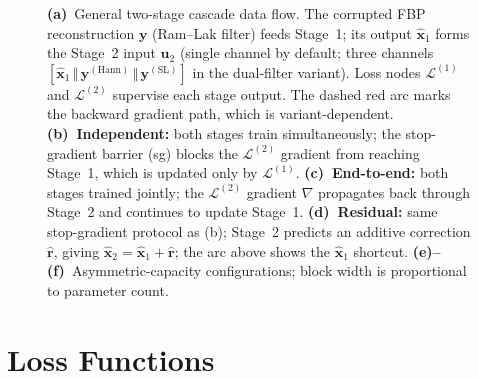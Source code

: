 \begin{figure}[!htb]
\caption[Cascade architecture variants.]{%
    \textbf{(a)}~General two-stage cascade data flow. The corrupted FBP
    reconstruction $\mathbf{y}$ (Ram--Lak filter) feeds Stage~1; its output
    $\hat{\mathbf{x}}_1$ forms the Stage~2 input $\mathbf{u}_2$ (single channel by default;
    three channels $[\hat{\mathbf{x}}_1\,\Vert\,\mathbf{y}^{(\mathrm{Hann})}\,\Vert\,\mathbf{y}^{(\mathrm{SL})}]$
    in the dual-filter variant).
    Loss nodes $\mathcal{L}^{(1)}$ and $\mathcal{L}^{(2)}$ supervise
    each stage output. The dashed red arc marks the backward gradient path,
    which is variant-dependent.
    \textbf{(b)~Independent:} both stages train simultaneously; the
    stop-gradient barrier (sg) blocks the $\mathcal{L}^{(2)}$ gradient from
    reaching Stage~1, which is updated only by $\mathcal{L}^{(1)}$.
    \textbf{(c)~End-to-end:} both stages trained jointly; the
    $\mathcal{L}^{(2)}$ gradient $\nabla$ propagates back through Stage~2
    and continues to update Stage~1.
    \textbf{(d)~Residual:} same stop-gradient protocol as (b); Stage~2
    predicts an additive correction $\hat{\mathbf{r}}$, giving
    $\hat{\mathbf{x}}_2 = \hat{\mathbf{x}}_1 + \hat{\mathbf{r}}$;
    the arc above shows the $\hat{\mathbf{x}}_1$ shortcut.
    \textbf{(e)--(f)}~Asymmetric-capacity configurations; block width is
    proportional to parameter count.}
\label{fig:meth_cascade_variants}
\end{figure}

\FloatBarrier

\section{Loss Functions}
\label{sec:meth_loss}

